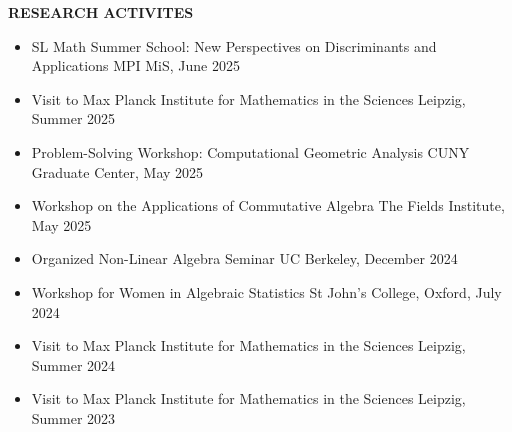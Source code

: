 \documentclass[11pt]{article}
\newcommand{\hdr}[1]{\textcolor{blue(ryb)}{\textbf{#1}}}
\begin{document}
\hdr{RESEARCH ACTIVITES}\\
\begin{itemize}
  \item SL Math Summer School: New Perspectives on Discriminants and Applications \hfill MPI MiS, June 2025
  \item Visit to Max Planck Institute for Mathematics in the Sciences \hfill Leipzig, Summer 2025  
  \item Problem-Solving Workshop: Computational Geometric Analysis \hfill CUNY Graduate Center, May 2025
  \item Workshop on the Applications of Commutative Algebra \hfill The Fields Institute, May 2025
  \item Organized Non-Linear Algebra Seminar \hfill UC Berkeley, December 2024
  \item Workshop for Women in Algebraic Statistics \hfill St John's College, Oxford, July 2024
  \item Visit to Max Planck Institute for Mathematics in the Sciences \hfill Leipzig, Summer 2024
  \item Visit to Max Planck Institute for Mathematics in the Sciences \hfill Leipzig, Summer 2023
\end{itemize}

\bigskip
\end{document}
